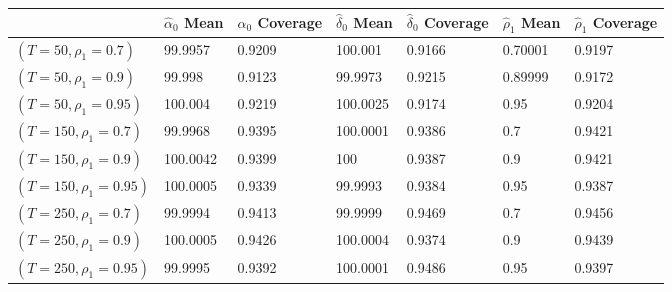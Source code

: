 \begin{tabular}{lllllll}
& $\hat{\alpha}_0$ Mean & $\hat{\alpha}_0$ Coverage & $\hat{\delta}_0$ Mean & $\hat{\delta}_0$ Coverage & $\hat{\rho}_1$ Mean & $\hat{\rho}_1$ Coverage \\ 
\hline 
$(T=50,\rho_1=0.7)$ & 99.9957 & 0.9209 & 100.001 & 0.9166 & 0.70001 & 0.9197 \\ 
$(T=50,\rho_1=0.9)$ & 99.998 & 0.9123 & 99.9973 & 0.9215 & 0.89999 & 0.9172 \\ 
$(T=50,\rho_1=0.95)$ & 100.004 & 0.9219 & 100.0025 & 0.9174 & 0.95 & 0.9204 \\ 
$(T=150,\rho_1=0.7)$ & 99.9968 & 0.9395 & 100.0001 & 0.9386 & 0.7 & 0.9421 \\ 
$(T=150,\rho_1=0.9)$ & 100.0042 & 0.9399 & 100 & 0.9387 & 0.9 & 0.9421 \\ 
$(T=150,\rho_1=0.95)$ & 100.0005 & 0.9339 & 99.9993 & 0.9384 & 0.95 & 0.9387 \\ 
$(T=250,\rho_1=0.7)$ & 99.9994 & 0.9413 & 99.9999 & 0.9469 & 0.7 & 0.9456 \\ 
$(T=250,\rho_1=0.9)$ & 100.0005 & 0.9426 & 100.0004 & 0.9374 & 0.9 & 0.9439 \\ 
$(T=250,\rho_1=0.95)$ & 99.9995 & 0.9392 & 100.0001 & 0.9486 & 0.95 & 0.9397 \\ 
\hline 
\end{tabular}